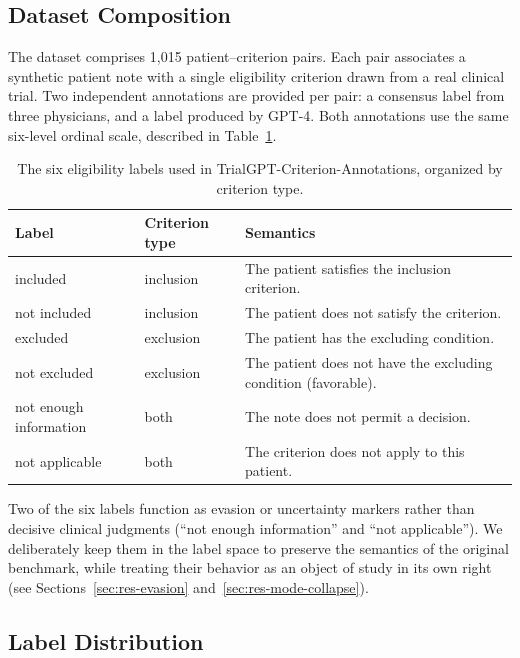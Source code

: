 \subsection{Dataset Composition}
\label{subsec:met-data-composition}

The dataset comprises 1{,}015 patient--criterion pairs. Each pair associates 
a synthetic patient note with a single eligibility criterion drawn from a 
real clinical trial. Two independent annotations are provided per pair: a 
consensus label from three physicians, and a label produced by GPT-4. Both 
annotations use the same six-level ordinal scale, described in 
Table~\ref{tab:met-labels}.

\begin{table}[htbp]
    \centering
    \caption{The six eligibility labels used in TrialGPT-Criterion-Annotations,
        organized by criterion type.}
    \label{tab:met-labels}
    \small
    \begin{tabular}{@{}p{2.5cm}p{2.5cm}p{7cm}@{}}
        \toprule
        \textbf{Label} & \textbf{Criterion type} & \textbf{Semantics} \\
        \midrule
        included & inclusion & The patient satisfies the inclusion criterion. \\
        not included & inclusion & The patient does not satisfy the criterion. \\
        excluded & exclusion & The patient has the excluding condition. \\
        not excluded & exclusion & The patient does not have the excluding condition (favorable). \\
        not enough information & both & The note does not permit a decision. \\
        not applicable & both & The criterion does not apply to this patient. \\
        \bottomrule
    \end{tabular}
\end{table}

Two of the six labels function as evasion or uncertainty markers rather than 
decisive clinical judgments (``not enough information'' and 
``not applicable''). We deliberately keep them in the label space to preserve 
the semantics of the original benchmark, while treating their behavior as an 
object of study in its own right (see Sections~\ref{sec:res-evasion} 
and~\ref{sec:res-mode-collapse}).

\subsection{Label Distribution}
\label{subsec:met-data-distribution}

